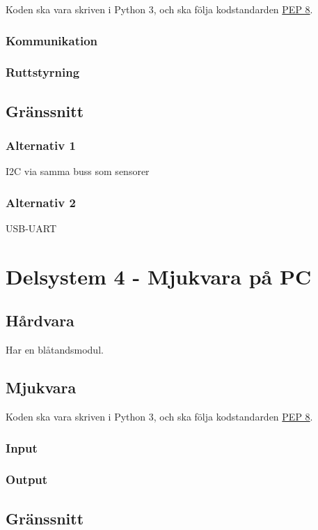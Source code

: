\documentclass[a4paper,11pt]{article}
\begin{document}
Koden ska vara skriven i Python 3, och ska följa kodstandarden \href{https://www.python.org/dev/peps/pep-0008/}{PEP 8}.

\subsubsection{Kommunikation}

\subsubsection{Ruttstyrning}

\subsection{Gränssnitt} \label{ssec:brainInterface}

\subsubsection{Alternativ 1}
I2C via samma buss som sensorer

\subsubsection{Alternativ 2}
USB-UART

\section{Delsystem 4 - Mjukvara på PC}

\subsection{Hårdvara}
Har en blåtandsmodul.

\subsection{Mjukvara}

Koden ska vara skriven i Python 3, och ska följa kodstandarden \href{https://www.python.org/dev/peps/pep-0008/}{PEP 8}.

\subsubsection{Input}

\subsubsection{Output}

\subsection{Gränssnitt} \label{ssec:PCInterface}


\begin{appendices}

\end{appendices}
\end{document}

